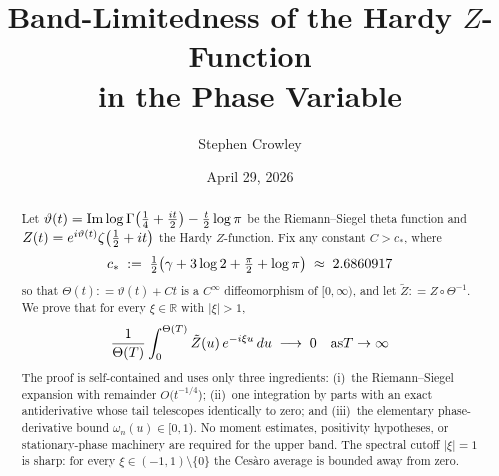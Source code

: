 \documentclass{amsart}
\newcommand{\tmop}[1]{\ensuremath{\operatorname{#1}}}
\newcommand{\Ima}{\tmop{Im}}
\begin{document}
\title{Band-Limitedness of the Hardy $Z$-Function\\
in the Phase Variable}

\author{Stephen Crowley}

\date{April 29, 2026}

\begin{abstract}
  Let $\vartheta (t) = \Ima \log \Gamma \hspace{-0.17em} \left( \tfrac{1}{4} +
  \tfrac{it}{2} \right) - \tfrac{t}{2} \log \pi$ be the Riemann--Siegel theta
  function and $Z (t) = e^{i \vartheta (t)} \zeta \hspace{-0.17em} \left(
  \tfrac{1}{2} + it \right)$ the Hardy $Z$-function. Fix any constant $C >
  c_{\ast}$, where
  \begin{equation}
    c_{\ast} \hspace{0.27em} : = \hspace{0.27em} \tfrac{1}{2} \hspace{-0.17em}
    \left( \gamma + 3 \log 2 + \tfrac{\pi}{2} + \log \pi \right)
    \hspace{0.27em} \approx \hspace{0.27em} 2.6860917
  \end{equation}
  so that $\Theta (t) : = \vartheta (t) + Ct$ is a $C^{\infty}$ diffeomorphism
  of $[0, \infty)$, and let $\tilde{Z} : = Z \circ \Theta^{- 1}$. We prove
  that for every $\xi \in \mathbb{R}$ with $| \xi | > 1$,
  \begin{equation}
    \frac{1}{\Theta (T)} \int_0^{\Theta (T)} \tilde{Z} (u) \hspace{0.17em}
    e^{- i \xi u} \hspace{0.17em} du \hspace{0.27em} \longrightarrow
    \hspace{0.27em} 0 \quad \text{as} T \to \infty
  \end{equation}
  The proof is self-contained and uses only three ingredients: (i)~the
  Riemann--Siegel expansion with remainder $O (t^{- 1 / 4}$); (ii)~one
  integration by parts with an exact antiderivative whose tail telescopes
  identically to zero; and (iii)~the elementary phase-derivative bound
  $\omega_n (u) \in [0, 1$). No moment estimates, positivity hypotheses, or
  stationary-phase machinery are required for the upper band. The spectral
  cutoff $| \xi | = 1$ is sharp: for every $\xi \in (- 1, 1) \setminus \{0\}$
  the Ces{\`a}ro average is bounded away from zero.
\end{abstract}
\end{document}
